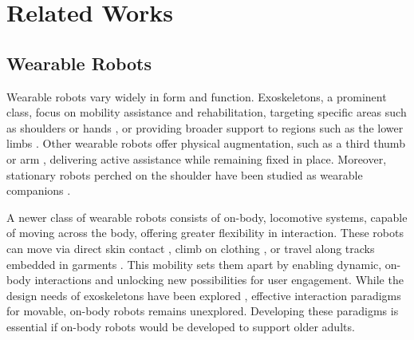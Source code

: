 \section{Related Works}
\subsection{Wearable Robots}

Wearable robots vary widely in form and function. Exoskeletons, a prominent class, focus on mobility assistance and rehabilitation, targeting specific areas such as shoulders or hands \cite{oneill2017exoshoulder, gao2023portable, in2015exo}, or providing broader support to regions such as the lower limbs \cite{huo2014exolower, asbeck2014stronger}. Other wearable robots offer physical augmentation, such as a third thumb \cite{zhou2019novel, shafti2021playing} or arm \cite{muehlhaus2023need, vatsal2017wearing}, delivering active assistance while remaining fixed in place. Moreover, stationary robots perched on the shoulder have been studied as wearable companions \cite{tsumaki201220, jiang2019survey}.



A newer class of wearable robots consists of on-body, locomotive systems, capable of moving across the body, offering greater flexibility in interaction. These robots can move via direct skin contact \cite{dementyev2017skinbot}, climb on clothing \cite{dementyev2016rovables, birkmeyer2011clash}, or travel along tracks embedded in garments \cite{sathya2022calico}. This mobility sets them apart by enabling dynamic, on-body interactions and unlocking new possibilities for user engagement. While the design needs of exoskeletons have been explored \cite{jung2019older}, effective interaction paradigms for movable, on-body robots remains unexplored. Developing these paradigms is essential if on-body robots would be developed to support older adults.

